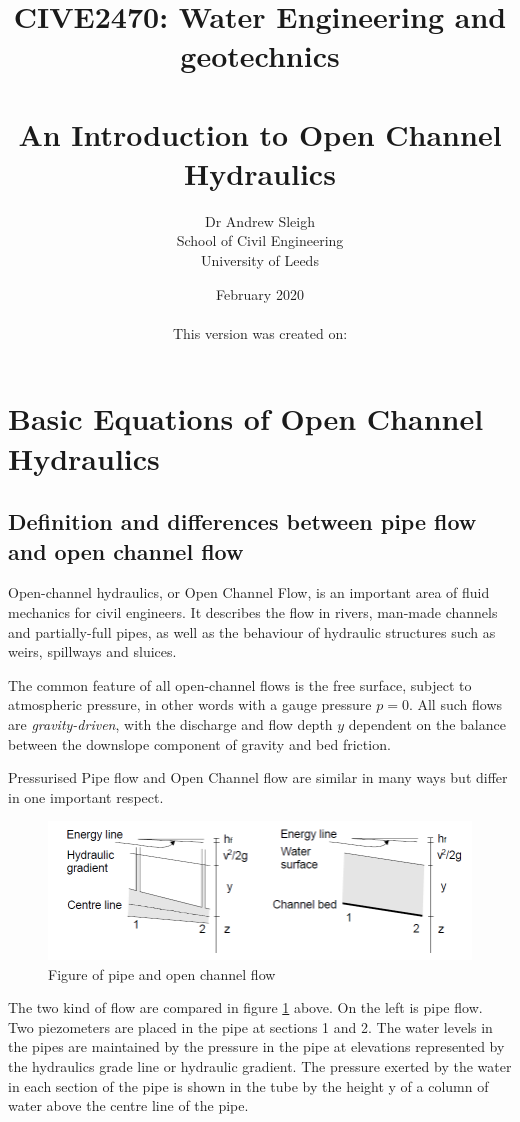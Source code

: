 \documentclass[a4paper, 12pt, british]{article} %
\title{CIVE2470: Water Engineering and geotechnics\\ \quad \\An Introduction to Open Channel Hydraulics}
\author{Dr Andrew Sleigh\\School of Civil Engineering\\University of Leeds}
\date{February 2020 \\ \quad \\{\scriptsize This version was created on:\\ \DTMnow}}
\numberwithin{equation}{section}
\numberwithin{figure}{section}
\numberwithin{table}{section}
\begin{document}
\maketitle

\tableofcontents


\newpage 
\section{Basic Equations of Open Channel Hydraulics}
\subsection{Definition and differences between pipe flow and open channel flow}
Open-channel hydraulics, or Open Channel Flow, is an important area of fluid mechanics for civil engineers. It describes the flow in rivers, man-made channels and partially-full pipes, as well as the behaviour of hydraulic structures such as weirs, spillways and sluices. 

The common feature of all open-channel flows is the free surface, subject to atmospheric pressure, in other words with a gauge pressure $p = 0$. All such flows are \textit{gravity-driven}, with the discharge and flow depth $y$ dependent on the balance between the downslope component of gravity and bed friction.

Pressurised Pipe flow and Open Channel flow are similar in many ways but differ in one important respect. 
\begin{figure}[H]
	\centering
	\includegraphics[scale=0.6]{./images/fig_11.png}
	\caption{Figure of pipe and open channel flow}
	\label{fig:111}
\end{figure}


The two kind of flow are compared in figure \ref{fig:111} above. On the left is pipe flow. Two piezometers are placed in the pipe at sections 1 and 2. The water levels in the pipes are maintained by the pressure in the pipe at elevations represented by the hydraulics grade line or hydraulic gradient. The pressure exerted by the water in each section of the pipe is shown in the tube by the height y of a column of water above the centre line of the pipe.
\end{document}
